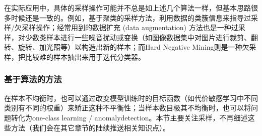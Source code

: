 \documentclass[12pt]{article}
\begin{document}
在实际应用中，具体的采样操作可能并不总是如上述几个算法一样，但基本思路很多时候还是一致的。例如，基于聚类的采样方法，利用数据的类簇信息来指导过采样/欠采样操作；经常用到的数据扩充 (data augmentation) 方法也是一种过采样，对少数类样本进行一些噪音扰动或变换（如图像数据集中对图片进行裁剪、翻转、旋转、加光照等）以构造出新的样本；而Hard Negative Mining则是一种欠采样，把比较难的样本抽出来用于迭代分类器。

\subsubsection{基于算法的方法}
在样本不均衡时，也可以通过改变模型训练时的目标函数（如代价敏感学习中不同类别有不同的权重）来矫正这种不平衡性；当样本数目极其不均衡时，也可以将问题转化为one-class learning / anomalydetection。本节主要关注采样，不再细述这些方法（我们会在其它章节的陆续推送相关知识点）。



\end{document}
